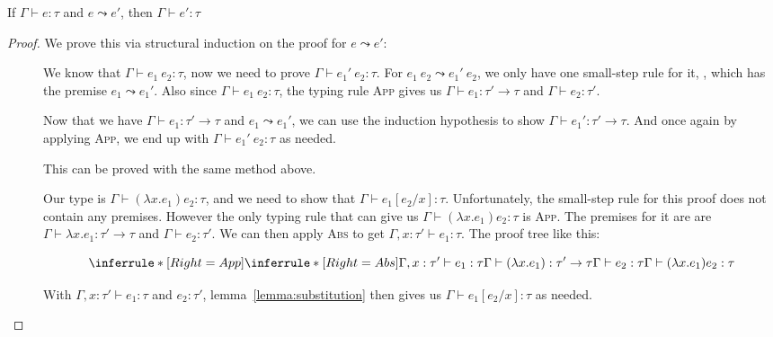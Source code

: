 \begin{theorem}[Preservation]
  If $\Gamma \vdash e : \tau$ and $e \leadsto e'$, then $\Gamma \vdash e' : \tau$
\end{theorem}

\begin{proof}
  We prove this via structural induction on the proof for $e \leadsto e'$:
  \begin{description}
  \item[] We know that
    $\Gamma \vdash e_1 \ e_2 : \tau$, now we need to prove
    $\Gamma \vdash e_1' \ e_2 : \tau$. For
    $e_1 \ e_2 \leadsto e_1' \ e_2$, we only have one small-step rule for it,
    , which has the premise $e_1 \leadsto e_1'$. Also since
    $\Gamma \vdash e_1 \ e_2 : \tau$, the typing rule \textsc{App} gives us
    $\Gamma \vdash e_1 : \tau' \rightarrow \tau$ and $\Gamma \vdash e_2 : \tau'$.

    Now that we have $\Gamma \vdash e_1 : \tau' \rightarrow \tau$ and $e_1 \leadsto e_1'$, we can use
    the induction hypothesis to show $\Gamma \vdash e_1' : \tau' \rightarrow \tau$. And once
    again by applying \textsc{App}, we end up with $\Gamma \vdash e_1' \ e_2 :
    \tau$ as needed.

  \item[] This can be proved with the
    same method above.

  \item[] Our type is
    $\Gamma \vdash (\lambda x . e_1) e_2 : \tau$, and we need to show that
    $\Gamma \vdash e_1 [e_2 / x] : \tau$.
    Unfortunately, the small-step rule for this proof does not contain any
    premises.
    However the only typing rule that can give us $\Gamma \vdash (\lambda x . e_1) e_2
    : \tau$ is \textsc{App}. The premises for it are
    are $\Gamma \vdash \lambda x . e_1 : \tau' \rightarrow \tau$ and $\Gamma \vdash e_2 : \tau'$. We can then apply
    \textsc{Abs} to get $\Gamma, x : \tau' \vdash e_1 : \tau$. The proof tree like this:

    $$\inferrule*[Right=App]{
      \inferrule*[Right=Abs]{\Gamma, x : \tau' \vdash e_1 : \tau}{\Gamma \vdash (\lambda x . e_1) : \tau' \rightarrow \tau} \\ \Gamma \vdash e_2 : \tau
    }
      {\Gamma \vdash (\lambda x . e_1) e_2 : \tau}
    $$
    
    With $\Gamma, x : \tau' \vdash e_1 : \tau$ and $e_2 : \tau'$,
    lemma~\ref{lemma:substitution} then gives us
    $\Gamma \vdash e_1 [e_2 / x] : \tau$ as needed.


\end{description}
\end{proof}
